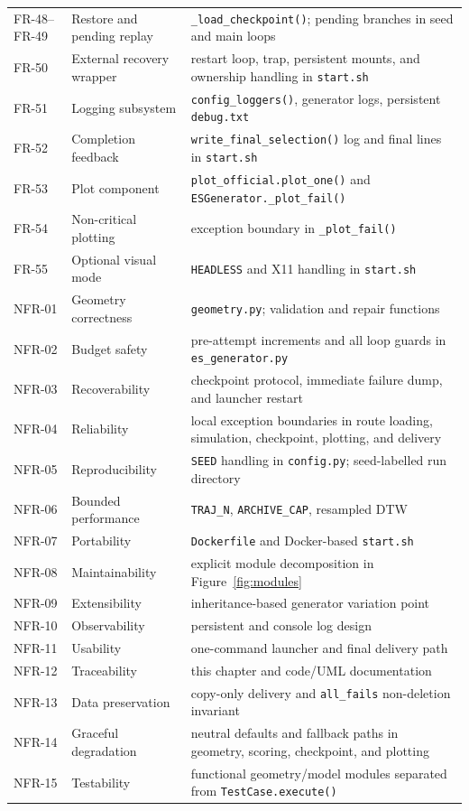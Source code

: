 \documentclass[11pt,a4paper]{report}
\newcommand{\code}[1]{\texttt{#1}}
\begin{document}
\begin{longtable}{L{2.3cm} L{4.2cm} L{7.7cm}}
FR-48--FR-49 & Restore and pending replay & \code{\_load\_checkpoint()}; pending branches in seed and main loops\\
FR-50 & External recovery wrapper & restart loop, trap, persistent mounts, and ownership handling in \code{start.sh}\\
FR-51 & Logging subsystem & \code{config\_loggers()}, generator logs, persistent \code{debug.txt}\\
FR-52 & Completion feedback & \code{write\_final\_selection()} log and final lines in \code{start.sh}\\
FR-53 & Plot component & \code{plot\_official.plot\_one()} and \code{ESGenerator.\_plot\_fail()}\\
FR-54 & Non-critical plotting & exception boundary in \code{\_plot\_fail()}\\
FR-55 & Optional visual mode & \code{HEADLESS} and X11 handling in \code{start.sh}\\
NFR-01 & Geometry correctness & \code{geometry.py}; validation and repair functions\\
NFR-02 & Budget safety & pre-attempt increments and all loop guards in \code{es\_generator.py}\\
NFR-03 & Recoverability & checkpoint protocol, immediate failure dump, and launcher restart\\
NFR-04 & Reliability & local exception boundaries in route loading, simulation, checkpoint, plotting, and delivery\\
NFR-05 & Reproducibility & \code{SEED} handling in \code{config.py}; seed-labelled run directory\\
NFR-06 & Bounded performance & \code{TRAJ\_N}, \code{ARCHIVE\_CAP}, resampled DTW\\
NFR-07 & Portability & \code{Dockerfile} and Docker-based \code{start.sh}\\
NFR-08 & Maintainability & explicit module decomposition in Figure~\ref{fig:modules}\\
NFR-09 & Extensibility & inheritance-based generator variation point\\
NFR-10 & Observability & persistent and console log design\\
NFR-11 & Usability & one-command launcher and final delivery path\\
NFR-12 & Traceability & this chapter and code/UML documentation\\
NFR-13 & Data preservation & copy-only delivery and \code{all\_fails} non-deletion invariant\\
NFR-14 & Graceful degradation & neutral defaults and fallback paths in geometry, scoring, checkpoint, and plotting\\
NFR-15 & Testability & functional geometry/model modules separated from \code{TestCase.execute()}\\
\bottomrule
\end{longtable}
\normalsize
\end{document}
